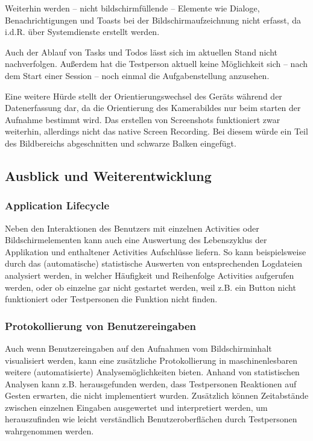 Weiterhin werden -- nicht bildschirmfüllende -- Elemente wie Dialoge, Benachrichtigungen und Toasts bei der Bildschirmaufzeichnung nicht erfasst, da i.d.R. über Systemdienste erstellt werden.

Auch der Ablauf von Tasks und Todos lässt sich im aktuellen Stand nicht nachverfolgen.
Außerdem hat die Testperson aktuell keine Möglichkeit sich -- nach dem Start einer Session -- noch einmal die Aufgabenstellung anzusehen.

Eine weitere Hürde stellt der Orientierungswechsel des Geräts während der Datenerfassung dar, da die Orientierung des Kamerabildes nur beim starten der Aufnahme bestimmt wird.
Das erstellen von Screenshots funktioniert zwar weiterhin, allerdings nicht das native Screen Recording.
Bei diesem würde ein Teil des Bildbereichs abgeschnitten und schwarze Balken eingefügt.
 
 
\subsection{Ausblick und Weiterentwicklung}

\subsubsection{Application Lifecycle}
Neben den Interaktionen des Benutzers mit einzelnen Activities oder Bildschirmelementen kann auch eine Auswertung des Lebenszyklus der Applikation und enthaltener Activities Aufschlüsse liefern.
So kann beispielsweise durch das (automatische) statistische Auswerten von entsprechenden Logdateien analysiert werden, in welcher Häufigkeit und Reihenfolge Activities aufgerufen werden, oder ob einzelne gar nicht gestartet werden, weil z.B. ein Button nicht funktioniert oder Testpersonen die Funktion nicht finden.

\subsubsection{Protokollierung von Benutzereingaben}
Auch wenn Benutzereingaben auf den Aufnahmen vom Bildschirminhalt visualisiert werden, kann eine zusätzliche Protokollierung in maschinenlesbaren weitere (automatisierte) Analysemöglichkeiten bieten.
Anhand von statistischen Analysen kann z.B. herausgefunden werden, dass Testpersonen Reaktionen auf Gesten erwarten, die nicht implementiert wurden.
Zusätzlich können Zeitabstände zwischen einzelnen Eingaben ausgewertet und interpretiert werden, um herauszufinden wie leicht verständlich Benutzeroberflächen durch Testpersonen wahrgenommen werden.

